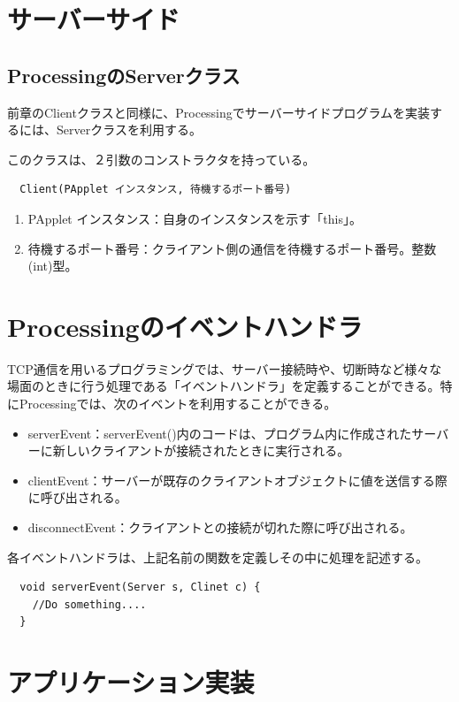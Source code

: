 \documentclass[dvipdfmx]{jsarticle}
\begin{document}
\section{サーバーサイド}
\subsection{ProcessingのServerクラス}
前章のClientクラスと同様に、Processingでサーバーサイドプログラムを実装するには、Serverクラスを利用する。\par
このクラスは、２引数のコンストラクタを持っている。
\begin{verbatim}
  Client(PApplet インスタンス, 待機するポート番号)
\end{verbatim}
\begin{enumerate}
  \item PApplet インスタンス：自身のインスタンスを示す「this」。
  \item 待機するポート番号：クライアント側の通信を待機するポート番号。整数(int)型。
\end{enumerate}
\section{Processingのイベントハンドラ}
TCP通信を用いるプログラミングでは、サーバー接続時や、切断時など様々な場面のときに行う処理である「イベントハンドラ」を定義することができる。特にProcessingでは、次のイベントを利用することができる。\par
\begin{itemize}
  \item serverEvent：serverEvent()内のコードは、プログラム内に作成されたサーバーに新しいクライアントが接続されたときに実行される。
  \item clientEvent：サーバーが既存のクライアントオブジェクトに値を送信する際に呼び出される。
  \item disconnectEvent：クライアントとの接続が切れた際に呼び出される。
\end{itemize}
各イベントハンドラは、上記名前の関数を定義しその中に処理を記述する。
\begin{verbatim}
  void serverEvent(Server s, Clinet c) {
    //Do something....
  }
\end{verbatim}

\section{アプリケーション実装}
\end{document}
